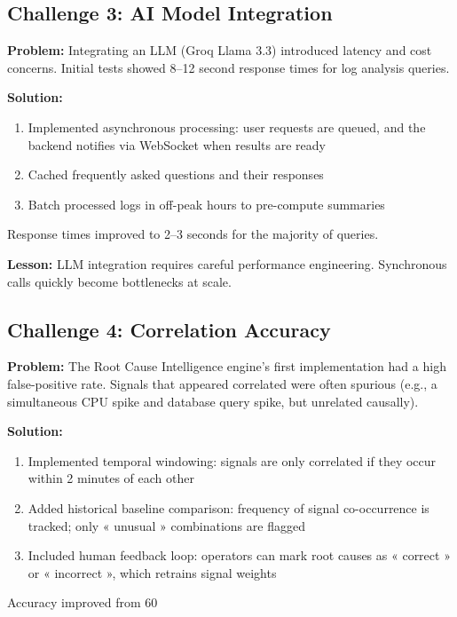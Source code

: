 \documentclass[12pt,a4paper]{report}
\begin{document}
\subsection{Challenge 3: AI Model Integration}

\textbf{Problem:} Integrating an LLM (Groq Llama 3.3) introduced latency and cost concerns. Initial tests showed 8–12 second response times for log analysis queries.

\textbf{Solution:} 
\begin{enumerate}
  \item Implemented asynchronous processing: user requests are queued, and the backend notifies via WebSocket when results are ready
  \item Cached frequently asked questions and their responses
  \item Batch processed logs in off-peak hours to pre-compute summaries
\end{enumerate}

Response times improved to 2–3 seconds for the majority of queries.

\textbf{Lesson:} LLM integration requires careful performance engineering. Synchronous calls quickly become bottlenecks at scale.

\subsection{Challenge 4: Correlation Accuracy}

\textbf{Problem:} The Root Cause Intelligence engine's first implementation had a high false-positive rate. Signals that appeared correlated were often spurious (e.g., a simultaneous CPU spike and database query spike, but unrelated causally).

\textbf{Solution:}
\begin{enumerate}
  \item Implemented temporal windowing: signals are only correlated if they occur within 2 minutes of each other
  \item Added historical baseline comparison: frequency of signal co-occurrence is tracked; only « unusual » combinations are flagged
  \item Included human feedback loop: operators can mark root causes as « correct » or « incorrect », which retrains signal weights
\end{enumerate}

Accuracy improved from 60%
\end{document}
